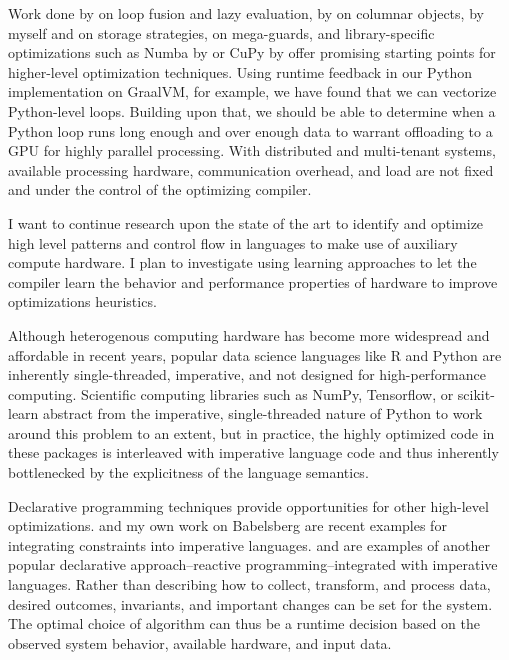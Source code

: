 \documentclass[11pt,a4paper,sans]{moderncv} %
\begin{document}
\begin{refsection}[plan]
\begin{description}
    Work done by \cite{palkar2017weld} on loop fusion and lazy evaluation, by
    \cite{mattis2015columnar} on columnar objects, by myself and
    \cite{pape2015language} on storage strategies,
    \cite{qunaibit2018accelerating} on mega-guards, and library-specific
    optimizations such as Numba by \cite{lam2015numba} or CuPy by
    \cite{nishino2017cupy} offer promising starting points for higher-level
    optimization techniques. Using runtime feedback in our Python implementation
    on GraalVM, for example, we have found that we can vectorize Python-level
    loops. Building upon that, we should be able to determine when a Python loop
    runs long enough and over enough data to warrant offloading to a GPU for
    highly parallel processing. With distributed and multi-tenant systems,
    available processing hardware, communication overhead, and load are not
    fixed and under the control of the optimizing compiler.

    I want to continue research upon the state of the art to identify and
    optimize high level patterns and control flow in languages to make use of
    auxiliary compute hardware. I plan to investigate using learning approaches
    to let the compiler learn the behavior and performance properties of
    hardware to improve optimizations heuristics.
  \item[Declarative Programming and Dataflow] Although heterogenous computing
    hardware has become more widespread and affordable in recent years, popular
    data science languages like R and Python are inherently single-threaded,
    imperative, and not designed for high-performance computing. Scientific
    computing libraries such as NumPy, Tensorflow, or scikit-learn abstract from
    the imperative, single-threaded nature of Python to work around this problem
    to an extent, but in practice, the highly optimized code in these packages
    is interleaved with imperative language code and thus inherently
    bottlenecked by the explicitness of the language semantics.

    Declarative programming techniques provide opportunities for other
    high-level optimizations. \cite{koksal2012constraints,
      milicevic2011unifying} and my own work on Babelsberg are recent examples
    for integrating constraints into imperative
    languages. \cite{drechsler2014distributed} and
    \cite{DBLP:journals/corr/RamsonH17} are examples of another popular
    declarative approach--reactive programming--integrated with imperative
    languages. Rather than describing how to collect, transform, and process
    data, desired outcomes, invariants, and important changes can be set for the
    system. The optimal choice of algorithm can thus be a runtime decision based
    on the observed system behavior, available hardware, and input data.


\end{description}
\end{refsection}
\end{document}

